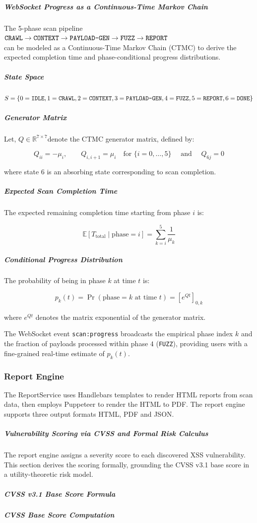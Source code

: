\subparagraph*{WebSocket Progress as a Continuous-Time Markov Chain}

The 5-phase scan pipeline\\
$
\texttt{CRAWL}
\rightarrow
\texttt{CONTEXT}
\rightarrow
\texttt{PAYLOAD\mbox{-}GEN}
\rightarrow
\texttt{FUZZ}
\rightarrow
\texttt{REPORT}
$ \\
can be modeled as a Continuous-Time Markov Chain (CTMC) to derive the expected completion time and phase-conditional progress distributions.

\subparagraph*{State Space}
$
S =
\{
0=\texttt{IDLE},
1=\texttt{CRAWL},
2=\texttt{CONTEXT},
3=\texttt{PAYLOAD\mbox{-}GEN},
4=\texttt{FUZZ},
5=\texttt{REPORT},
6=\texttt{DONE}
\}
$

\subparagraph*{Generator Matrix}

Let, $ Q \in \mathbb{R}^{7 \times 7} $denote the CTMC generator matrix, defined by:

\[
Q_{ii} = -\mu_i,
\qquad
Q_{i,i+1} = \mu_i
\quad
\text{for \{} i=0,\dots,5 
\text{\}}
\quad
\text{ and } 
\quad
Q_{6j} = 0 
\]

where state \(6\) is an absorbing state corresponding to scan completion.

\subparagraph*{Expected Scan Completion Time}

The expected remaining completion time starting from phase \(i\) is:

\[
\mathbb{E}[T_{\text{total}} \mid \text{phase}=i]
=
\sum_{k=i}^{5}
\frac{1}{\mu_k}
\]

\subparagraph*{Conditional Progress Distribution}

The probability of being in phase \(k\) at time \(t\) is:

\[
p_k(t)
=
\Pr(\text{phase}=k \text{ at time } t)
=
\left[e^{Qt}\right]_{0,k}
\]

where \(e^{Qt}\) denotes the matrix exponential of the generator matrix.

The WebSocket event
\texttt{scan:progress}
broadcasts the empirical phase index \(k\) and the fraction of payloads processed within phase \(4\) (\texttt{FUZZ}), providing users with a fine-grained real-time estimate of \(p_k(t)\).

\subsubsection{Report Engine}
The ReportService uses Handlebars templates to render HTML reports from scan data, then employs Puppeteer to render the HTML to PDF. The report engine supports three output formats HTML, PDF and JSON.
\subparagraph*{Vulnerability Scoring via CVSS and Formal Risk Calculus}
The report engine assigns a severity score to each discovered XSS vulnerability. This section derives the scoring formally, grounding the CVSS v3.1 base score in a utility-theoretic risk model.
\subparagraph*{CVSS v3.1 Base Score Formula}
\subparagraph*{CVSS Base Score Computation}

